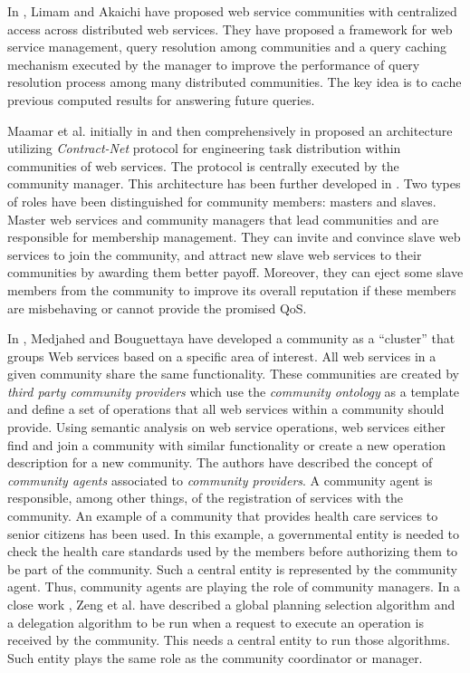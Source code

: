 \documentclass[10pt,journal,cspaper,compsoc]{IEEEtran}
\begin{document}
In \cite{managing-hela-jalel}, Limam and Akaichi have proposed web
service communities with centralized access across distributed web
services. They have proposed a framework for web service
management, query resolution among communities and a query caching
mechanism executed by the manager to improve the performance of
query resolution process among many distributed communities. The
key idea is to cache previous computed results for answering
future queries.


Maamar et al. initially in \cite{conf/webist/MaamarLBTS07} and
then comprehensively in \cite{DBLP:journals/ijebr/MaamarSTBB09}
proposed an architecture utilizing \emph{Contract-Net} protocol
for engineering task distribution within communities of web
services. The protocol is centrally executed by the community
manager. This architecture has been further developed in
\cite{CSTintercommunity, conf/IEEEscc/BenharrefSBB11,
conf/IEEEscc/KhosravifarBMMT10, conf/aina/LimTM11}. Two types of
roles have been distinguished for community members: masters and
slaves. Master web services and community managers that lead
communities and are responsible for membership management. They
can invite and convince slave web services to join the community,
and attract new slave web services to their communities by
awarding them better payoff. Moreover, they can eject some slave
members from the community to improve its overall reputation if
these members are misbehaving or cannot provide the promised QoS.

In \cite{Medjahed05adynamic}, Medjahed and Bouguettaya have
developed a community as a ``cluster'' that groups Web services
based on a specific area of interest. All web services in a given
community share the same functionality. These communities are
created by \emph{third party community providers} which use the
\emph{community ontology} as a template and define a set of
operations that all web services within a community should
provide. Using semantic analysis on web service operations, web
services either find and join a community with similar
functionality or create a new operation description for a new
community. The authors have described the concept of
\emph{community agents} associated to \emph{community providers}.
A community agent is responsible, among other things, of the
registration of services with the community. An example of a
community that provides health care services to senior citizens
has been used. In this example, a governmental entity is needed to
check the health care standards used by the members before
authorizing them to be part of the community. Such a central
entity is represented by the community agent. Thus, community
agents are playing the role of community managers. In a close work
\cite{Zeng:2003:QDW:775152.775211}, Zeng et al. have described a
global planning selection algorithm and a delegation algorithm to
be run when a request to execute an operation is received by the
community. This needs a central entity to run those algorithms.
Such entity plays the same role as the community coordinator or
manager.
\end{document}
